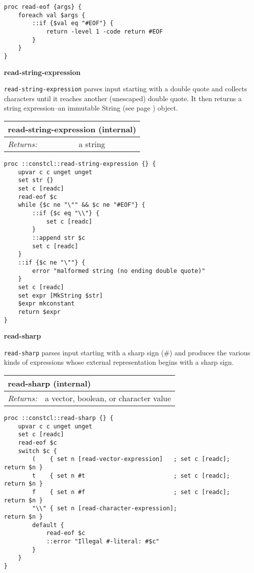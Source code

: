 \documentclass{report}
\begin{document}
\noindent\makebox[\linewidth]{\rule{\linewidth}{0.4pt}}
\begin{lstlisting}
proc read-eof {args} {
    foreach val $args {
        ::if {$val eq "#EOF"} {
            return -level 1 -code return #EOF
        }
    }
}
\end{lstlisting}
\noindent\makebox[\linewidth]{\rule{\linewidth}{0.4pt}}

\textbf{read-string-expression}


\texttt{read-string-expression} parses input starting with a double quote and collects characters until it reaches another (unescaped) double quote. It then returns a string expression--an immutable String (see page \pageref{strings}) object.

\begin{tabular}{ |l l| }
\hline
\multicolumn{2}{|l|}{read-string-expression (internal)} \\
\hline
\textit{Returns:} & a string \\
\hline
\end{tabular}

\noindent\makebox[\linewidth]{\rule{\linewidth}{0.4pt}}
\begin{lstlisting}
proc ::constcl::read-string-expression {} {
    upvar c c unget unget
    set str {}
    set c [readc]
    read-eof $c
    while {$c ne "\"" && $c ne "#EOF"} {
        ::if {$c eq "\\"} {
            set c [readc]
        }
        ::append str $c
        set c [readc]
    }
    ::if {$c ne "\""} {
        error "malformed string (no ending double quote)"
    }
    set c [readc]
    set expr [MkString $str]
    $expr mkconstant
    return $expr
}
\end{lstlisting}
\noindent\makebox[\linewidth]{\rule{\linewidth}{0.4pt}}

\textbf{read-sharp}


\texttt{read-sharp} parses input starting with a sharp sign (\#) and produces the various kinds of expressions whose external representation begins with a sharp sign.

\begin{tabular}{ |l l| }
\hline
\multicolumn{2}{|l|}{read-sharp (internal)} \\
\hline
\textit{Returns:} & a vector, boolean, or character value \\
\hline
\end{tabular}

\noindent\makebox[\linewidth]{\rule{\linewidth}{0.4pt}}
\begin{lstlisting}
proc ::constcl::read-sharp {} {
    upvar c c unget unget
    set c [readc]
    read-eof $c
    switch $c {
        (    { set n [read-vector-expression]   ; set c [readc]; return $n }
        t    { set n #t                         ; set c [readc]; return $n }
        f    { set n #f                         ; set c [readc]; return $n }
        "\\" { set n [read-character-expression];                return $n }
        default {
            read-eof $c
            ::error "Illegal #-literal: #$c"
        }
    }
}
\end{lstlisting}
\noindent\makebox[\linewidth]{\rule{\linewidth}{0.4pt}}
\end{document}
